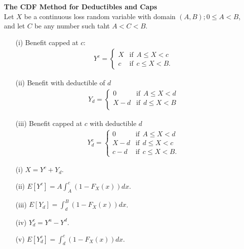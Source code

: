 \documentclass{article}
\numberwithin{theorem}{subsection}
\numberwithin{theorem}{subsubsection}
\numberwithin{lemma}{subsection}
\numberwithin{lemma}{subsubsection}
\theoremstyle{definition}
\numberwithin{definition}{subsection}
\numberwithin{definition}{subsubsection}
\begin{document}
\noindent \textbf{The CDF Method for Deductibles and Caps}\\
\indent Let $X$ be a continuous loss random variable with domain $(A,B); 0 \leq A < B$, and let $C$ be any number such taht $A < C < B$.
\begin{itemize}
    \item[(i)] Benefit capped at $c$: \\
        \begin{gather}
        Y^{c} = \begin{cases}
                    X & \text{if}\ \ A \leq X < c\\
                    c & \text{if}\ \ c \leq X < B.
                \end{cases}
        \end{gather}
    \item[(ii)] Benefit with deductible of $d$\\
        \begin{gather}
            Y_{d} = \begin{cases}
                        0 & \text{if}\ \ A \leq X < d\\
                        X - d & \text{if} \ \ d \leq X < B\\
                    \end{cases}
        \end{gather}
    \item[(iii)] Benefit capped at $c$ with deductible $d$\\
        \begin{gather}
            Y_{d}^{c} = \begin{cases}
                            0 & \text{if}\ \ A \leq X < d\\
                            X - d & \text{if}\ \ d \leq X < c\\
                            c - d & \text{if}\ \ c \leq X < B.
                        \end{cases}
        \end{gather}
\end{itemize}
\begin{itemize}
    \item[(i)] $X = Y^{c} + Y_{d}$.
    \item[(ii)] $E[Y^{c}] = A \int_{A}^{c}(1 - F_{X}(x))dx$.
    \item[(iii)] $E[Y_{d}] = \int_{d}^{B}(1 - F_{X}(x))dx$.
    \item[(iv)] $Y_{d}^{c} = Y^{u} - Y^{d}$.
    \item[(v)] $E[Y_{d}^{c}] = \int_{d}^{c}(1 - F_{X}(x))dx$.
\end{itemize}
\end{document}

